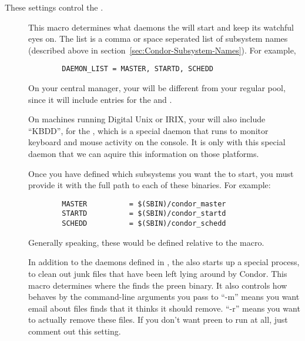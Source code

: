 These settings control the .

\begin{description}
  
\item[] \label{param:DaemonList} This macro
  determines what daemons the  will start and keep its
  watchful eyes on.  The list is a comma or space seperated list of
  subsystem names (described above in
  section~\ref{sec:Condor-Subsystem-Names}).  For example,

\begin{verbatim}
        DAEMON_LIST = MASTER, STARTD, SCHEDD
\end{verbatim}

  \Note On your central manager, your 
  will be different from your regular pool, since it will include
  entries for the  and .  
  
  \Note On machines running Digital Unix or IRIX, your
   will also include ``KBDD'', for the
  , which is a special daemon that runs to monitor
  keyboard and mouse activity on the console.  It is only with this
  special daemon that we can aquire this information on those
  platforms. 

\item[] \label{param:SUBSYS} Once you have defined which
  subsystems you want the  to start, you must provide
  it with the full path to each of these binaries.  For example:

\begin{verbatim}
        MASTER          = $(SBIN)/condor_master
        STARTD          = $(SBIN)/condor_startd
        SCHEDD          = $(SBIN)/condor_schedd
\end{verbatim}

  Generally speaking, these would be defined relative to the
   macro.
  
\item[] \label{param:Preen} In addition to the daemons
  defined in , the  also starts up
  a special process,  to clean out junk files that have
  been left lying around by Condor.  This macro determines where the
   finds the preen binary.  It also controls how
   behaves by the command-line arguments you pass to
  ``-m'' means you want email about files  finds that it
  thinks it should remove.  ``-r'' means you want  to
  actually remove these files.  If you don't want preen to run at all,
  just comment out this setting.


\end{description}
